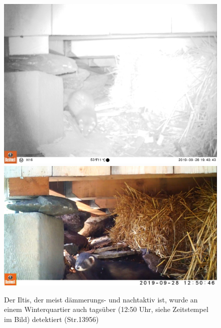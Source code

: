 \documentclass[
  oneside]{scrbook}
\begin{document}
\begin{figure}
\includegraphics[width=1\linewidth]{images/str13956/09280317} \includegraphics[width=1\linewidth]{images/str13956/capture} \caption{Der Iltis, der meist dämmerungs- und nachtaktiv ist, wurde an einem Winterquartier auch tagsüber (12:50 Uhr, siehe Zeitstempel im Bild) detektiert (Str.13956)}\label{fig:unnamed-chunk-7}
\end{figure}
\end{document}
